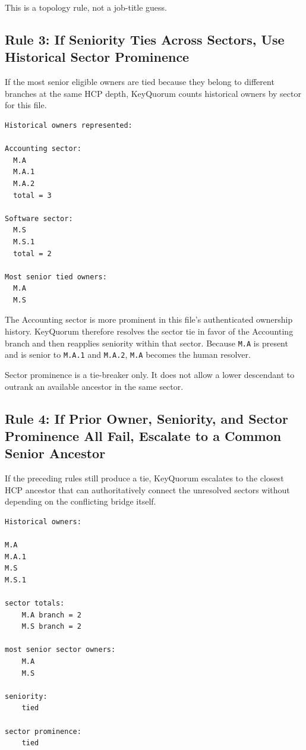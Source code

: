 \documentclass[11pt]{article}
\begin{document}
This is a topology rule, not a job-title guess.

\subsection{Rule 3: If Seniority Ties Across Sectors, Use Historical Sector Prominence}

If the most senior eligible owners are tied because they belong to different branches at the same HCP depth, KeyQuorum counts historical owners by sector for this file.

\begin{lstlisting}
Historical owners represented:

Accounting sector:
  M.A
  M.A.1
  M.A.2
  total = 3

Software sector:
  M.S
  M.S.1
  total = 2

Most senior tied owners:
  M.A
  M.S
\end{lstlisting}

The Accounting sector is more prominent in this file's authenticated ownership history. KeyQuorum therefore resolves the sector tie in favor of the Accounting branch and then reapplies seniority within that sector. Because \texttt{M.A} is present and is senior to \texttt{M.A.1} and \texttt{M.A.2}, \texttt{M.A} becomes the human resolver.

Sector prominence is a tie-breaker only. It does not allow a lower descendant to outrank an available ancestor in the same sector.

\subsection{Rule 4: If Prior Owner, Seniority, and Sector Prominence All Fail, Escalate to a Common Senior Ancestor}

If the preceding rules still produce a tie, KeyQuorum escalates to the closest HCP ancestor that can authoritatively connect the unresolved sectors without depending on the conflicting bridge itself.

\begin{lstlisting}
Historical owners:

M.A
M.A.1
M.S
M.S.1

sector totals:
    M.A branch = 2
    M.S branch = 2

most senior sector owners:
    M.A
    M.S

seniority:
    tied

sector prominence:
    tied
\end{lstlisting}
\end{document}
